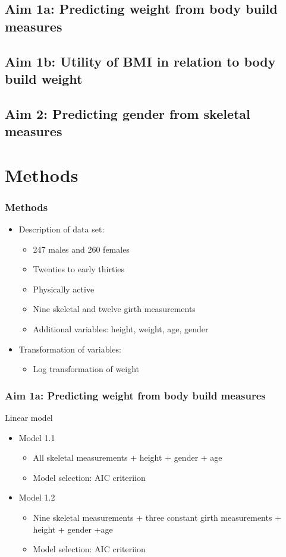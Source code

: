 \documentclass{beamer}
\begin{document}
\subsection{Aim 1a: Predicting weight from body build measures}

\subsection{Aim 1b: Utility of BMI in relation to body build weight}

\subsection{Aim 2: Predicting gender from skeletal measures}

\section{Methods}

\begin{frame}
\frametitle{Methods}

\begin{itemize}
	\item Description of data set:  
		\begin{itemize}
			\item 247 males and 260 females
			\item Twenties to early thirties
			\item Physically active
			\item Nine skeletal and twelve girth measurements
			\item Additional variables: height, weight, age, gender
		\end{itemize}
	\item Transformation of variables:
		\begin{itemize}
			\item Log transformation of weight
		\end{itemize}
\end{itemize}

\end{frame}

\begin{frame}
\frametitle{Aim 1a: Predicting weight from body build measures}

Linear model 
\begin{itemize}
	\item Model 1.1
		\begin{itemize}
			\item All skeletal measurements + height + gender + age
			\item Model selection: AIC criteriion
		\end{itemize}
	\item Model 1.2
		\begin{itemize}
			\item Nine skeletal measurements + three constant girth measurements + height + gender +age
			\item Model selection: AIC criteriion
		\end{itemize}
\end{itemize}

\end{frame}
\end{document}

